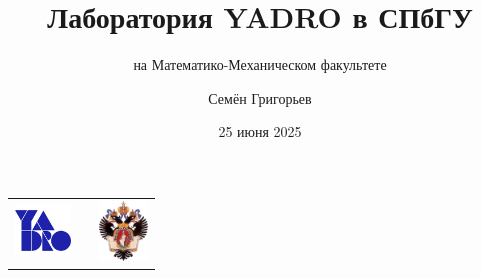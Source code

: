 \documentclass[xcolor=table,aspectratio=169]{beamer}
\title[Лаборатория YADRO, Мат-Мех СПбГУ]{Лаборатория YADRO в СПбГУ}
\subtitle{на Математико-Механическом факультете}
\institute[СПбГУ]{
Санкт-Петербургский Государственный Университет
}
\author[Семён Григорьев]{Семён Григорьев}
\date{25 июня 2025}
\begin{document}
{
\begin{frame}[fragile]
  \begin{table}
  \centering
  \begin{tabularx}{\linewidth}{XcX}
    \includegraphics[height=1.4cm]{pictures/YADRO_Logo.png} 
    \hfill
    & 
    & \hfill \includegraphics[height=1.6cm]{pictures/SPbGU_Logo.png}
  \end{tabularx}
  \end{table}
  \titlepage
\end{frame}
}
\end{document}
